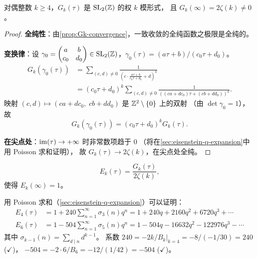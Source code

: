 \begin{theorem}[$G_k$ 是模形式]
\label{thm:Gk-modular}
对偶整数 $k \geq 4$，$G_k(\tau)$ 是 $\mathrm{SL}_2(\mathbb{Z})$ 的权 $k$ 模形式，
且 $G_k(\infty) = 2\zeta(k) \neq 0$。
\end{theorem}

\begin{proof}
\textbf{全纯性}：由\cref{prop:Gk-convergence}，一致收敛的全纯函数之极限是全纯的。

\textbf{变换律}：设 $\gamma_0 = \begin{pmatrix} a & b \\ c_0 & d_0 \end{pmatrix}
\in \mathrm{SL}_2(\mathbb{Z})$，$\gamma_0(\tau) = (a\tau + b)/(c_0\tau + d_0)$。
\begin{align}
  G_k(\gamma_0(\tau))
  &= \sum_{(c,d) \neq 0} \frac{1}{\!\left(c \cdot \frac{a\tau+b}{c_0\tau+d_0} + d\right)^{\!k}} \\
  &= (c_0\tau + d_0)^k
     \sum_{(c,d) \neq 0} \frac{1}{((ca + dc_0)\tau + (cb + dd_0))^k}.
\end{align}
映射 $(c, d) \mapsto (ca+dc_0,\; cb+dd_0)$ 是 $\mathbb{Z}^2 \setminus \{0\}$ 上的双射
（由 $\det\gamma_0 = 1$），故
\[
  G_k(\gamma_0(\tau)) = (c_0\tau + d_0)^k G_k(\tau).
\]

\textbf{在尖点处}：$\operatorname{im}(\tau) \to +\infty$ 时非常数项趋于 $0$
（将在\cref{sec:eisenstein-q-expansion}中用 Poisson 求和证明），
故 $G_k(\tau) \to 2\zeta(k)$，在尖点处全纯。
\end{proof}

\begin{definition}
\label{def:normalized-eisenstein}
\[
  E_k(\tau) = \frac{G_k(\tau)}{2\zeta(k)},
\]
使得 $E_k(\infty) = 1$。
\end{definition}

\begin{example}[$E_4, E_6$ 的展开（预告）]
\label{ex:E4-E6-expansion}
用 Poisson 求和（\cref{sec:eisenstein-q-expansion}）可以证明：
\begin{align*}
  E_4(\tau) &= 1 + 240\sum_{n=1}^{\infty} \sigma_3(n) q^n
  = 1 + 240q + 2160q^2 + 6720q^3 + \cdots \\
  E_6(\tau) &= 1 - 504\sum_{n=1}^{\infty} \sigma_5(n) q^n
  = 1 - 504q - 16632q^2 - 122976q^3 - \cdots
\end{align*}
其中 $\sigma_{k-1}(n) = \sum_{d \mid n} d^{k-1}$。
系数 $240 = -2k/B_k|_{k=4} = -8/(-1/30) = 240$ ($\checkmark$)，
$-504 = -2 \cdot 6 / B_6 = -12 / (1/42) = -504$ ($\checkmark$)。
\end{example}




